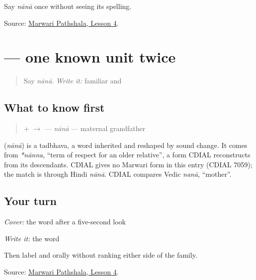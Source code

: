 \begin{tcolorbox}[breakable,colback=teal!4,colframe=teal!35!black,title={Before you move on}]
Say \emph{nānā} once without seeing its spelling.

Source: \href{https://www.marwaripathshala.com/marwari-lesson-4-english}{Marwari Pathshala, Lesson 4}.
\end{tcolorbox}
\section[\texorpdfstring{\mw{नाना} (nānā)}{नाना (nānā)}]{ — one known unit twice}

\label{lesson:MW-C09-nana}



\begin{quote}
Say \emph{nānā}. \emph{Write it:} familiar \textbf{} and \textbf{}
\end{quote}

\subsection*{What to know first}
\begin{quote}
\textbf{} + \textbf{} $\to$ \textbf{} — \emph{nānā} — maternal grandfather
\end{quote}

\begin{cousinweb}
\textbf{} (\emph{nānā}) is a tadbhava, a word inherited and reshaped by sound change. It comes from \emph{*nānna}, \textquotedblleft{}term of respect for an older relative\textquotedblright{}, a form CDIAL reconstructs from its descendants. CDIAL gives no Marwari form in this entry (CDIAL 7059); the match is through Hindi \emph{nānā}. CDIAL compares Vedic \emph{nanā}, \textquotedblleft{}mother\textquotedblright{}.
\end{cousinweb}

\subsection*{Your turn}
\emph{Cover:} the word after a five-second look

\emph{Write it:} the word

Then label \textbf{} and \textbf{} orally without ranking either side of the family.

\begin{tcolorbox}[breakable,colback=teal!4,colframe=teal!35!black,title={Before you move on}]
Source: \href{https://www.marwaripathshala.com/marwari-lesson-4-english}{Marwari Pathshala, Lesson 4}.
\end{tcolorbox}
